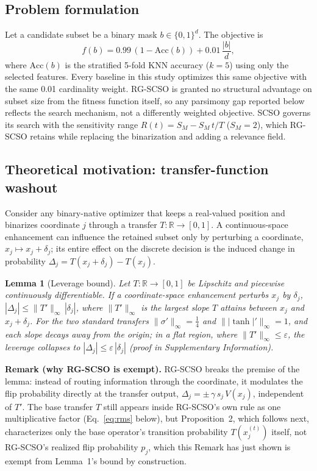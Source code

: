 \documentclass[iicol,sn-basic,pdflatex]{sn-jnl}
\newtheorem{lemma}{Lemma}
\begin{document}
\subsection{Problem formulation}
Let a candidate subset be a binary mask $b\in\{0,1\}^d$. The objective is
\begin{equation}
  f(b) = 0.99\,(1-\mathrm{Acc}(b)) + 0.01\,\frac{|b|}{d},
  \label{eq:fitness}
\end{equation}
where $\mathrm{Acc}(b)$ is the stratified 5-fold KNN accuracy ($k=5$) using only
the selected features. Every baseline in this study optimizes this same
objective with the same 0.01 cardinality weight. RG-SCSO is granted no
structural advantage on subset size from the fitness function itself, so any
parsimony gap reported below reflects the search mechanism, not a differently
weighted objective. SCSO governs its search with the sensitivity range
$R(t)=S_M - S_M\,t/T$ ($S_M=2$), which RG-SCSO retains while replacing the
binarization and adding a relevance field.

\subsection{Theoretical motivation: transfer-function washout}
\label{sec:washout}
Consider any binary-native optimizer that keeps a real-valued position and
binarizes coordinate $j$ through a transfer $T:\mathbb{R}\to[0,1]$. A
continuous-space enhancement can influence the retained subset only by
perturbing a coordinate, $x_j\mapsto x_j+\delta_j$; its entire effect on the
discrete decision is the induced change in probability
$\Delta_j=T(x_j+\delta_j)-T(x_j)$.

\begin{lemma}[Leverage bound]
Let $T:\mathbb{R}\to[0,1]$ be Lipschitz and piecewise continuously
differentiable. If a coordinate-space enhancement perturbs $x_j$ by $\delta_j$,
$|\Delta_j|\le\|T'\|_\infty\,|\delta_j|$, where $\|T'\|_\infty$ is the largest
slope $T$ attains between $x_j$ and $x_j+\delta_j$. For the two standard
transfers $\|\sigma'\|_\infty=\tfrac14$ and $\||\tanh|'\|_\infty=1$, and each
slope decays away from the origin; in a flat region, where
$\|T'\|_\infty\le\varepsilon$, the leverage collapses to
$|\Delta_j|\le\varepsilon\,|\delta_j|$ (proof in Supplementary Information).
\end{lemma}
\noindent\textbf{Remark (why RG-SCSO is exempt).} RG-SCSO breaks the premise
of the lemma: instead of routing information through the coordinate, it
modulates the flip probability directly at the transfer output,
$\Delta_j=\pm\,\gamma\,s_j\,V(x_j)$, independent of $T'$. The base transfer
$T$ still appears inside RG-SCSO's own rule as one multiplicative factor
(Eq.~\ref{eq:rms} below), but Proposition~2, which follows next,
characterizes only the base operator's transition probability
$T(x_j^{(t)})$ itself, not RG-SCSO's realized flip probability $p_j$, which
this Remark has just shown is exempt from Lemma~1's bound by construction.
\end{document}
